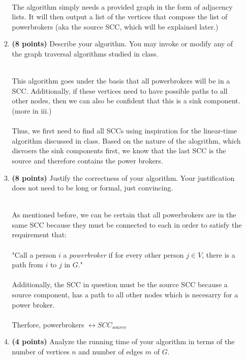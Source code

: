 \documentclass[11pt]{article}
\theoremstyle{definition}
\theoremstyle{theorem}
\newcommand{\solution}{\medskip\noindent{\color{DarkBlue}\textbf{Solution:}}}
\begin{document}
\begin{enumerate}[label=(\alph*)]
\begin{enumerate}[label=(\roman*)]
\solution \\

The algorithm simply needs a provided graph in the form of adjacency lists. It will then output a list of the vertices that compose the list of powerbrokers (aka the source SCC, which will be explained later.)

    
  \item  \textbf{(8 points)} Describe your algorithm.  You may invoke or
    modify any of the graph traversal algorithms studied in class.

\solution \\


This algorithm goes under the basis that all powerbrokers will be in a SCC. Additionally, if these vertices need to have possible paths to all other nodes, then we can also be confident that this is a sink component. (more in iii.) \\\\
Thus, we first need to find all SCCs using inspiration for the linear-time algorithm discussed in class. Based on the nature of the alogrithm, which disvoers the sink components first, we know that the last SCC is the source and therefore contains the power brokers.

  \item \textbf{(8 points)}
    Justify the correctness of your algorithm.  Your justification does
    not need to be long or formal, just convincing.

\solution \\ 

As mentioned before, we can be certain that all powerbrokers are in the same SCC because they must be connected to each in order to satisfy the requirement that:\\\\
"Call a person $i$ a {\em powerbroker}\/ if for every other person $j
\in V$, there is a path from $i$ to $j$ in $G$."\\\\
Additionally, the SCC in question must be the source SCC because a source component, has a path to all other nodes which is necesarry for a power broker.\\\\
Therfore, {powerbrokers} $\leftrightarrow SCC_{source}$ 

  \item  \textbf{(4 points)} Analyze the running time of your algorithm in terms of the
    number of vertices $n$ and number of edges $m$ of $G$.


\end{enumerate}
\end{enumerate}
\end{document}
